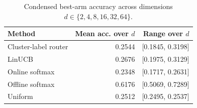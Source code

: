 \begin{table}[t]
\centering
\caption{Condensed best-arm accuracy across dimensions $d\in\{2,4,8,16,32,64\}$.}
\label{tab:best-arm-acc-condensed}
\begin{tabular}{lrr}
\toprule
Method & Mean acc. over $d$ & Range over $d$ \\
\midrule
Cluster-label router & 0.2544 & [0.1845, 0.3198] \\
LinUCB & 0.2676 & [0.1975, 0.3129] \\
Online softmax & 0.2348 & [0.1717, 0.2631] \\
Offline softmax & 0.6176 & [0.5069, 0.7289] \\
Uniform & 0.2512 & [0.2495, 0.2537] \\
\bottomrule
\end{tabular}
\end{table}
